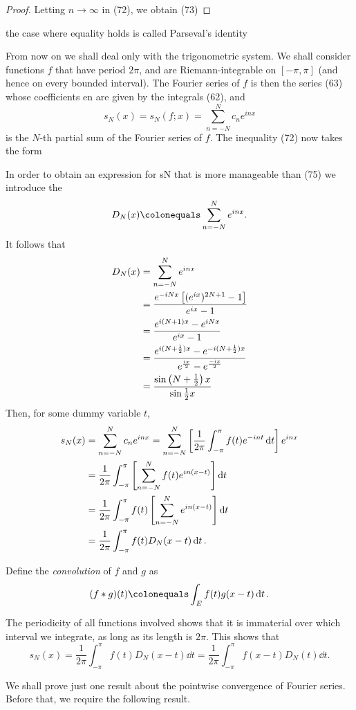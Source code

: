 \begin{proof}
Letting $n\to\infty$ in (72), we obtain (73)
\end{proof}
the case where equality holds is called Parseval's identity

From now on we shall deal only with the trigonometric system. We shall consider functions $f$ that have period $2\pi$, and are Riemann-integrable on $[-\pi,\pi]$ (and hence on every bounded interval). The Fourier series of $f$ is then the series (63) whose coefficients en are given by the integrals (62), and 
\[s_N(x)=s_N(f;x)=\sum_{n=-N}^{N}c_n e^{inx}\]
is the $N$-th partial sum of the Fourier series of $f$. The inequality (72) now takes the form

In order to obtain an expression for sN that is more manageable than (75) we introduce the 
\[D_N(x)\colonequals\sum_{n=-N}^{N}e^{inx}.\]
It follows that
\begin{align*}
D_N(x)&=\sum_{n=-N}^{N}e^{inx}\\
&=\frac{e^{-iNx}\left[(e^{ix})^{2N+1}-1\right]}{e^{ix}-1}\\
&=\frac{e^{i(N+1)x}-e^{iNx}}{e^{ix}-1}\\
&=\frac{e^{i(N+\frac{1}{2})x}-e^{-i(N+\frac{1}{2})x}}{e^\frac{ix}{2}-e^\frac{-ix}{2}}\\
&=\frac{\sin\left(N+\frac{1}{2}\right)x}{\sin\frac{1}{2}x}
\end{align*}
Then, for some dummy variable $t$,
\begin{align*}
s_N(x)&=\sum_{n=-N}^{N}c_n e^{inx}=\sum_{n=-N}^{N}\left[\frac{1}{2\pi}\int_{-\pi}^{\pi}f(t)e^{-int}\dd{t}\right]e^{inx}\\
&=\frac{1}{2\pi}\int_{-\pi}^{\pi}\left[\sum_{n=-N}^{N}f(t)e^{in(x-t)}\right]\dd{t}\\
&=\frac{1}{2\pi}\int_{-\pi}^{\pi}f(t)\left[\sum_{n=-N}^{N}e^{in(x-t)}\right]\dd{t}\\
&=\frac{1}{2\pi}\int_{-\pi}^{\pi}f(t)D_N(x-t)\dd{t}.
\end{align*}

Define the \emph{convolution} of $f$ and $g$ as
\[(f\ast g)(t)\colonequals\int_E f(t)g(x-t)\dd{t}.\]

The periodicity of all functions involved shows that it is immaterial over which interval we integrate, as long as its length is $2\pi$. This shows that
\[s_N(x)=\frac{1}{2\pi}\int_{-\pi}^{\pi}f(t)D_N(x-t)\dd{t}=\frac{1}{2\pi}\int_{-\pi}^{\pi}f(x-t)D_N(t)\dd{t}.\]

We shall prove just one result about the pointwise convergence of Fourier series. Before that, we require the following result.

